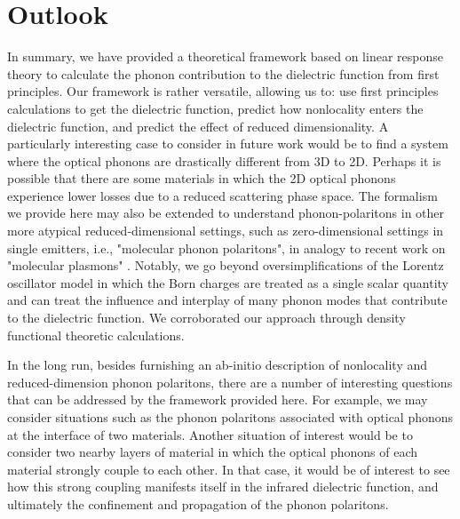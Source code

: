 \documentclass[superscriptaddress,reprint,prb]{revtex4-1}
\begin{document}




\section{Outlook}

In summary, we have provided a theoretical framework based on linear response theory to calculate the phonon contribution to the dielectric function from first principles. Our framework is rather versatile, allowing us to: use first principles calculations to get the dielectric function, predict how nonlocality enters the dielectric function, and predict the effect of reduced dimensionality. A particularly interesting case to consider in future work would be to find a system where the optical phonons are drastically different from 3D to 2D. Perhaps it is possible that there are some materials in which the 2D optical phonons experience lower losses due to a reduced scattering phase space. The formalism we provide here may also be extended to understand phonon-polaritons in other more atypical reduced-dimensional settings, such as zero-dimensional settings in single emitters, i.e., "molecular phonon polaritons", in analogy to recent work on "molecular plasmons" \cite{manjavacas2013tunable,lauchner2015molecular}. Notably, we go beyond oversimplifications of the Lorentz oscillator model in which the Born charges are treated as a single scalar quantity and can treat the influence and interplay of many phonon modes that contribute to the dielectric function. We corroborated our approach through density functional theoretic calculations.

In the long run, besides furnishing an ab-initio description of nonlocality and reduced-dimension phonon polaritons, there are a number of interesting questions that can be addressed by the framework provided here. For example, we may consider situations such as the phonon polaritons associated with optical phonons at the interface of two materials. Another situation of interest would be to consider two nearby layers of material in which the optical phonons of each material strongly couple to each other. In that case, it would be of interest to see how this strong coupling manifests itself in the infrared dielectric function, and ultimately the confinement and propagation of the phonon polaritons.








\end{document}
